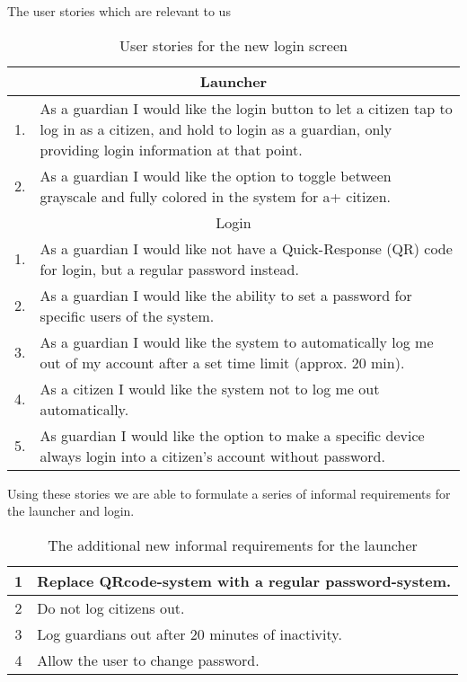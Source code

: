The user stories which are relevant to us



\begin{table}[H]
\begin{tabular}{|c|p{12.5cm}|}
\hline 
\multicolumn{2}{|c|}{Launcher}\\
\hline
1. & As a guardian I would like the login button to let a citizen tap to log in
as a citizen, and hold to login as a guardian, only providing login information
at that point. \\ \hline
2. & As a guardian I would like the option to toggle between grayscale and fully
colored in the system for a+
 citizen. \\ \hline
\multicolumn{2}{|c|}{Login}\\ \hline 
1. & As a guardian I would like not have a Quick-Response (QR) code for login,
but a regular password instead.\\ \hline 
2. & As a guardian I would like the ability to set a password for specific users
of the system.\\ \hline
3. & As a guardian I would like the system to automatically log me out of my
account after a set time limit (approx. 20 min).\\ \hline
4. & As a citizen I would like the system not to log me out automatically.\\ \hline
5. & As guardian I would like the option to make a specific device always login
into a citizen's account without password.\\ \hline
\end{tabular}
\caption{User stories for the new login screen}
\label{UserStoriesLogin}
\end{table}



Using these stories we are able to formulate a series of informal requirements
for the launcher and login.

\begin{table}[H]
\begin{tabular}{|c|p{12.5cm}|}
\hline
1 & Replace QRcode-system with a regular password-system. \\ \hline
2 & Do not log citizens out. \\ \hline
3 & Log guardians out after 20 minutes of inactivity. \\ \hline
4 & Allow the user to change password. \\ \hline
\end{tabular}
\caption{The additional new informal requirements for the launcher}
\label{LoginRequirements}
\end{table}

